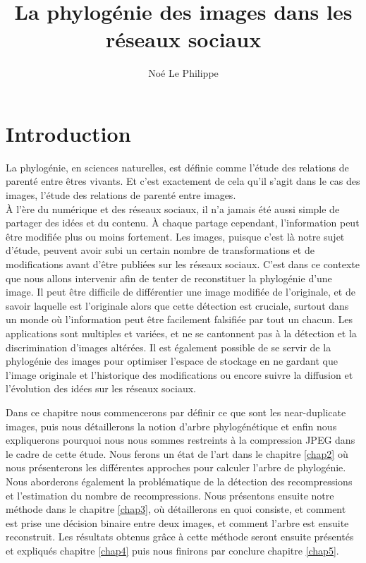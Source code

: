 \documentclass[utf8,final]{stageM2R} %
\author{Noé Le Philippe}
\title{La phylogénie des images dans les réseaux sociaux}
\begin{document}
   
\frontmatter  %
\maketitle    %
\cleardoublepage   
\tableofcontents %
\mainmatter  %



\chapter{Introduction}
La phylogénie, en sciences naturelles, est définie comme l'étude des relations de parenté entre êtres vivants. Et c'est exactement de cela qu'il s'agit dans le cas des images, l'étude des relations de parenté entre images. \autocite{phylogeny} \\
À l'ère du numérique et des réseaux sociaux, il n'a jamais été aussi simple de partager des idées et du contenu. À chaque partage cependant, l'information peut être modifiée plus ou moins fortement. Les images, puisque c'est là notre sujet d'étude, peuvent avoir subi un certain nombre de transformations et de modifications avant d'être publiées sur les réseaux sociaux. C'est dans ce contexte que nous allons intervenir afin de tenter de reconstituer la phylogénie d'une image. Il peut être difficile de différentier une image modifiée de l'originale, et de savoir laquelle est l'originale alors que cette détection est cruciale, surtout dans un monde où l'information peut être facilement falsifiée par tout un chacun. Les applications sont multiples et variées, et ne se cantonnent pas à la détection et la discrimination d'images altérées. Il est également possible de se servir de la phylogénie des images pour optimiser l'espace de stockage en ne gardant que l'image originale et l'historique des modifications ou encore suivre la diffusion et l'évolution des idées sur les réseaux sociaux. 

Dans ce chapitre nous commencerons par définir ce que sont les near-duplicate images, puis nous détaillerons la notion d'arbre phylogénétique et enfin nous expliquerons pourquoi nous nous sommes restreints à la compression JPEG dans le cadre de cette étude. Nous ferons un état de l'art dans le chapitre \ref{chap2} où nous présenterons les différentes approches pour calculer l'arbre de phylogénie. Nous aborderons également la problématique de la détection des recompressions et l'estimation du nombre de recompressions. Nous présentons ensuite notre méthode dans le chapitre \ref{chap3}, où détaillerons en quoi consiste, et comment est prise une décision binaire entre deux images, et comment l'arbre est ensuite reconstruit. Les résultats obtenus grâce à cette méthode seront ensuite présentés et expliqués chapitre \ref{chap4} puis nous finirons par conclure chapitre \ref{chap5}.
\end{document}
